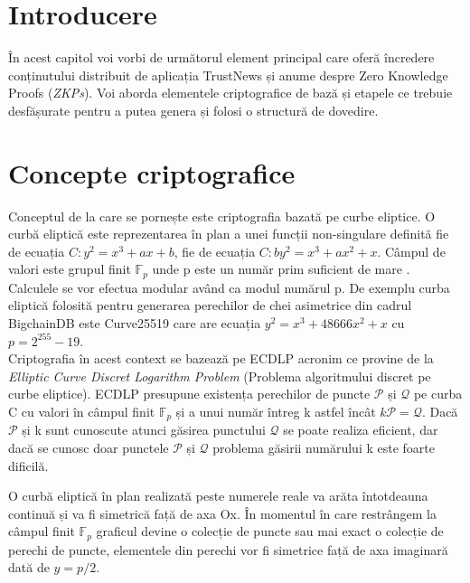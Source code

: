 
\section{Introducere}

În acest capitol voi vorbi de următorul element principal care oferă încredere conținutului distribuit de aplicația TrustNews și anume despre Zero Knowledge Proofs (\textit{ZKPs}). Voi aborda elementele criptografice de bază și etapele ce trebuie desfășurate pentru a putea genera și folosi o structură de dovedire.\\

\section{Concepte criptografice}

Conceptul de la care se pornește este criptografia bazată pe curbe eliptice. O curbă eliptică este reprezentarea în plan a unei funcții non-singulare definită fie de ecuația $C: y^2 = x^3 + ax +b$, fie de ecuația $C: by^2 = x^3 + ax^2 +x$. Câmpul de valori este grupul finit $\mathbb{F}_p$ unde p este un număr prim suficient de mare \cite{ZKS_Crypto_Basic}. Calculele se vor efectua modular având ca modul numărul p. De exemplu curba eliptică folosită pentru generarea perechilor de chei asimetrice din cadrul BigchainDB este Curve25519 \cite{ZKS_Curve25519} care are ecuația $y^2 = x^3 + 48666x^2 + x$ cu $p = 2^{255} - 19$.\\

Criptografia în acest context se bazează pe ECDLP acronim ce provine de la \textit{Elliptic Curve Discret Logarithm Problem} (Problema algoritmului discret pe curbe eliptice). ECDLP presupune existența perechilor de puncte $\mathcal{P}$ și $\mathcal{Q}$ pe curba C cu valori în câmpul finit $\mathbb{F}_p$ și a unui număr întreg k astfel încât $k\mathcal{P} = \mathcal{Q}$. Dacă $\mathcal{P}$ și k sunt cunoscute atunci găsirea punctului $\mathcal{Q}$ se poate realiza eficient, dar dacă se cunosc doar punctele $\mathcal{P}$ și $\mathcal{Q}$ problema găsirii numărului k este foarte dificilă.\\

\clearpage

O curbă eliptică în plan realizată peste numerele reale va arăta întotdeauna continuă și va fi simetrică față de axa Ox. În momentul în care restrângem la câmpul finit $\mathbb{F}_p$ graficul devine o colecție de puncte sau mai exact o colecție de perechi de puncte, elementele din perechi vor fi simetrice față de axa imaginară dată de $y = p/2$.

